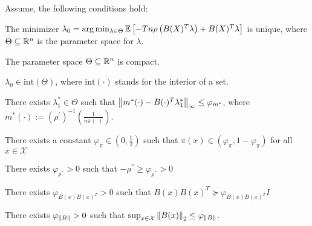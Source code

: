 
\begin{assumption}
  Assume, the following conditions hold:
  \begin{subassumption}
    \label{assumption_1_i} 
    The minimizer 
    $
    \lambda_0 
    =
    \arg \min_{\lambda \in \Theta}
    \mathbb{E}
    \left[ 
      -T n 
      \rho 
      \left( 
      B(X)^T \lambda
      \right)
      +
      B(X)^T \lambda
    \right]
    $
    is unique,
    where 
    $\Theta \subseteq \mathbb{R}^n$ is the parameter space for $\lambda$.
  \end{subassumption}
  \begin{subassumption}
    \label{assumption_1_ii} 
    The parameter space 
    $\Theta \subseteq \mathbb{R}^n$
    is compact.
  \end{subassumption}
  \begin{subassumption}
    \label{assumption_1_iii}
    $\lambda_0 \in \text{int}(\Theta)$,
    where
    $\text{int}(\cdot)$
    stands for the interior of a set.
  \end{subassumption}
  \begin{subassumption}
    \label{assumption_1_iv}
    There exists
    $\lambda^*_1 \in \Theta$
    such that
    $
      \left\lVert
        m^*(\cdot)
        -
        B(\cdot)^T \lambda^*_1
      \right\rVert_\infty
      \le 
      \varphi_{m^*}
    $,
    where
    $
      m^*(\cdot)
      :=
      \left( \rho^{'} \right)^{-1}
      \left( \frac{1}{n \pi(\cdot)} \right).
    $
  \end{subassumption}
  \begin{subassumption}
    \label{assumption_1_v}
    There exists a constant 
    $
      \varphi_{\pi} 
      \in 
      \left(0, \frac{1}{2} \right)
    $
    such that
    $
      \pi(x)
      \in 
      (
      \varphi_{ \pi },
      1 - \varphi_{ \pi }
      )
    $
    for all
    $
      x
      \in
      \mathcal{X}
    $
  \end{subassumption}
  \begin{subassumption}
    \label{assumption_1_vi}
    There exists 
    $ \varphi_{\rho^{''}} > 0 $
    such that
    $ -\rho^{''} \ge \varphi_{\rho^{''}} > 0 $
  \end{subassumption}
  \begin{subassumption}
    \label{assumption_1_vii}
    There exists 
    $ \varphi_{B(x) B(x)^T} > 0 $ 
    such that
    $
      B(x) B(x)^T 
      \succcurlyeq 
      \varphi_{B(x) B(x)^T} I 
    $
  \end{subassumption}
  \begin{subassumption}
    \label{assumption_1_viii}
    There exists
    $ \varphi_{\left\lVert B\right\rVert} > 0 $
    such that
    $
      \sup_{x \in \mathcal{X}} \left\lVert B(x)\right\rVert_2
      \le 
      \varphi_{\left\lVert B\right\rVert}
    $.
  \end{subassumption}
\end{assumption}




